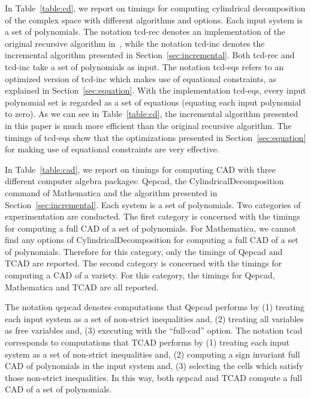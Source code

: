 \documentclass[10pt]{article}
\newcommand{\TCAD}{{\sc TCAD}}
\newcommand{\CAD}{{CAD}}
\newcommand{\QEPCAD}{{\sc Qepcad}}
\begin{document}
\begin{center}
In Table~\ref{table:cd}, we report on timings 
for computing cylindrical decomposition of the complex space
with different algorithms and options.
Each input system is a set of polynomials.
The notation tcd-rec denotes an 
implementation of the original recursive algorithm in~\cite{CMXY09},
while the notation tcd-inc denotes the incremental algorithm
presented in Section~\ref{sec:incremental}.
Both  tcd-rec and tcd-inc take a set of polynomials as input. 
The notation tcd-eqs refers to an optimized version of 
tcd-inc which makes use of equational constraints, as 
explained in Section~\ref{sec:equation}.
With the implementation tcd-eqs, every input polynomial set
is regarded as a set of equations (equating each input polynomial
to zero).
As we can see in Table~\ref{table:cd}, the incremental algorithm presented 
in this paper is much more efficient than the original recursive algorithm. 
The timings of tcd-eqs show that the optimizations
presented in Section~\ref{sec:equation}
for making use of equational constraints are very effective.


In Table~\ref{table:cad}, we report on timings 
for computing {\CAD} with three different computer algebra
packages: {\QEPCAD}, the {\sf CylindricalDecomposition} command 
of {\sf Mathematica} and the algorithm
presented in Section~\ref{sec:incremental}.
Each system is a set of polynomials.
Two categories of experimentation are conducted.
The first category is concerned with the timings 
for computing a full {\CAD} of a set of polynomials.
For {\sf Mathematica}, we cannot find
any options of {\sf CylindricalDecomposition} 
for computing a full {\CAD} of a set of 
polynomials.
Therefore for this category, 
only the timings of {\QEPCAD} and {\TCAD} are reported.
The second category is concerned with 
the timings for computing a {\CAD} of a variety.
For this category, the timings for {\QEPCAD}, {\sf Mathematica}
and {\sf TCAD} are all reported.


The notation qepcad denotes computations 
that {\QEPCAD} performs by (1) treating each input system as a set of 
non-strict inequalities and, (2) treating all variables as free 
variables and, (3) executing with the ``full-cad'' option.
The notation tcad corresponds to computations that {\TCAD}
performs by (1) treating each input system as a set of 
non-strict inequalities and,
(2) computing a sign invariant full {\CAD} of 
polynomials in the input system and, 
(3) selecting the cells which satisfy those non-strict inequalities. 
In this way, both qepcad and {\TCAD} compute a full {\CAD} of a set of 
polynomials.



\end{center}
\end{document}
